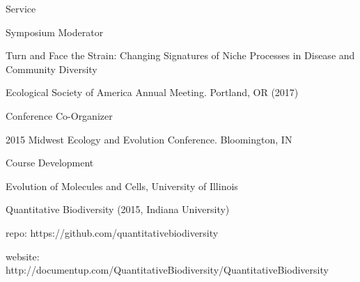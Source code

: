 \documentclass{resume} %
\begin{document}
\begin{rSection}{Service}

    \begin{rSubsection}{Symposium Moderator}{}{}{}
        \item Turn and Face the Strain: Changing Signatures of Niche
        Processes in Disease and Community Diversity
			\item Ecological Society of America Annual Meeting. Portland, OR (2017)
    \end{rSubsection}

    \begin{rSubsection}{Conference Co-Organizer}{}{}{}
        \item 2015 Midwest Ecology and Evolution Conference.
				Bloomington, IN
    \end{rSubsection}

    \begin{rSubsection}{Course Development}{}{}{}
        \item Evolution of Molecules and Cells, University of Illinois
        \item Quantitative Biodiversity (2015, Indiana University)
        \item \hspace{2ex} repo: https://github.com/quantitativebiodiversity
        \item \hspace{2ex} website:
        http://documentup.com/QuantitativeBiodiversity/QuantitativeBiodiversity
    \end{rSubsection}

\end{rSection}

\end{document}
